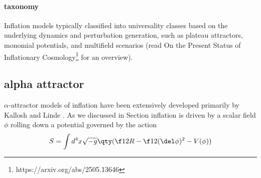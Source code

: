 
\paragraph{taxonomy}

Inflation models typically classified into universality classes based on the underlying dynamics and perturbation generation, such as plateau attractors, monomial potentials, and multifield scenarios (read On the Present Status of Inflationary Cosmology\footnote{https://arxiv.org/abs/2505.13646} for an overview).


\subsection*{alpha attractor}

$\alpha$-attractor models of inflation have been extensively developed primarily by Kallosh and Linde . As we discussed in Section  inflation is driven by a scalar field $\phi$ rolling down a potential governed by the action
\begin{equation}
    S=\int d^4x \sqrt{-g}\qty(\f12 R-\f12(\del \phi)^2-V(\phi))
\end{equation}


